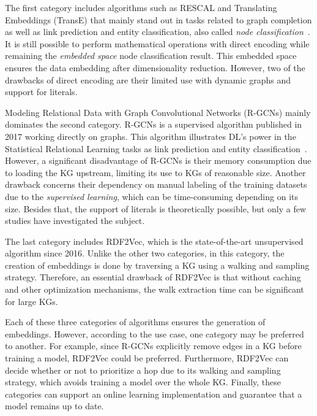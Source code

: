 The first category includes algorithms such as RESCAL and Translating Embeddings
(TransE) that mainly stand out in tasks related to graph completion as well as
link prediction and entity classification, also called \emph{node
classification}~\citep{DBLP:conf/nips/BordesUGWY13}. It is still possible to
perform mathematical operations with direct encoding while remaining the
\emph{embedded space} node classification result. This embedded space ensures
the data embedding after dimensionality reduction. However, two of the drawbacks
of direct encoding are their limited use with dynamic graphs and support for
literals.

Modeling Relational Data with Graph Convolutional Networks (R-GCNs) mainly
dominates the second category. R-GCNs is a supervised algorithm published in
2017 working directly on graphs. This algorithm illustrates DL's power in the
Statistical Relational Learning tasks as link prediction and entity
classification~\citep{DBLP:conf/esws/SchlichtkrullKB18}. However, a significant
disadvantage of R-GCNs is their memory consumption due to loading the KG
upstream, limiting its use to KGs of reasonable size. Another drawback concerns
their dependency on manual labeling of the training datasets due to the
\emph{supervised learning}, which can be time-consuming depending on its
size. Besides that, the support of literals is theoretically possible, but only
a few studies have investigated the subject.

The last category includes RDF2Vec, which is the state-of-the-art unsupervised
algorithm since 2016. Unlike the other two categories, in this category, the
creation of embeddings is done by traversing a KG using a walking and sampling
strategy. Therefore, an essential drawback of RDF2Vec is that without caching
and other optimization mechanisms, the walk extraction time can be significant
for large KGs.

Each of these three categories of algorithms ensures the generation of
embeddings. However, according to the use case, one category may be preferred to
another. For example, since R-GCNs explicitly remove edges in a KG before
training a model, RDF2Vec could be preferred. Furthermore, RDF2Vec can decide
whether or not to prioritize a hop due to its walking and sampling strategy,
which avoids training a model over the whole KG. Finally, these categories can
support an online learning implementation and guarantee that a model remains up
to date.

